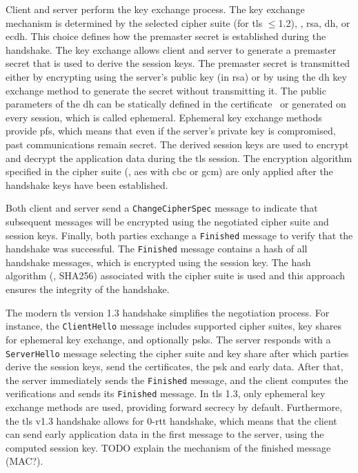 Client and server perform the key exchange process.
The key exchange mechanism is determined by the selected cipher suite (for \gls{tls} $\leq$1.2), \eg, \gls{rsa}, \gls{dh}, or \gls{ecdh}.
This choice defines how the premaster secret is established during the handshake.
The key exchange allows client and server to generate a premaster secret that is used to derive the session keys.
The premaster secret is transmitted either by encrypting using the server's public key (in \gls{rsa}) or by using the \gls{dh} key exchange method to generate the secret without transmitting it.
The public parameters of the \gls{dh} can be statically defined in the certificate~\cite{rfc5114} or generated on every session, which is called ephemeral.
Ephemeral key exchange methods provide \gls{pfs}, which means that even if the server's private key is compromised, past communications remain secret.
The derived session keys are used to encrypt and decrypt the application data during the \gls{tls} session.
The encryption algorithm specified in the cipher suite (\eg, \gls{aes} with \gls{cbc} or \gls{gcm}) are only applied after the handshake keys have been established.

Both client and server send a \texttt{ChangeCipherSpec} message to indicate that subsequent messages will be encrypted using the negotiated cipher suite and session keys.
Finally, both parties exchange a \texttt{Finished} message to verify that the handshake was successful.
The \texttt{Finished} message contains a hash of all handshake messages, which is encrypted using the session key.
The hash algorithm (\eg, SHA256) associated with the cipher suite is used and this approach ensures the integrity of the handshake.

The modern \gls{tls} version 1.3 handshake simplifies the negotiation process.
For instance, the \texttt{ClientHello} message includes supported cipher suites, key shares for ephemeral key exchange, and optionally \glspl{psk}.
The server responds with a \texttt{ServerHello} message selecting the cipher suite and key share after which parties derive the session keys, send the certificates, the \gls{psk} and early data.
After that, the server immediately sends the \texttt{Finished} message, and the client computes the verifications and sends its \texttt{Finished} message.
In \gls{tls} 1.3, only ephemeral key exchange methods are used, providing forward secrecy by default.
Furthermore, the \gls{tls} v1.3 handshake allows for 0-\gls{rtt} handshake, which means that the client can send early application data in the first message to the server, using the computed session key.
TODO explain the mechanism of the finished message (MAC?).

